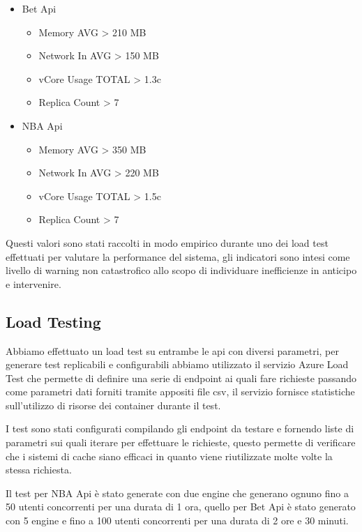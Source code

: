 \begin{itemize}
    \item Bet Api
    \begin{itemize}
        \item Memory AVG > 210 MB
        \item Network In AVG > 150 MB
        \item vCore Usage TOTAL > 1.3c
        \item Replica Count > 7
    \end{itemize}
    \item NBA Api
    \begin{itemize}
        \item Memory AVG > 350 MB
        \item Network In AVG > 220 MB
        \item vCore Usage TOTAL > 1.5c
        \item Replica Count > 7
    \end{itemize}
\end{itemize}

Questi valori sono stati raccolti in modo empirico durante uno dei load test effettuati per valutare la performance del sistema, gli indicatori sono intesi come livello di warning non catastrofico allo scopo di individuare inefficienze in anticipo e intervenire.

\subsection{Load Testing}
Abbiamo effettuato un load test su entrambe le api con diversi parametri, per generare test replicabili e configurabili abbiamo utilizzato il servizio Azure Load Test che permette di definire una serie di endpoint ai quali fare richieste passando come parametri dati forniti tramite appositi file csv, il servizio fornisce statistiche sull'utilizzo di risorse dei container durante il test.

I test sono stati configurati compilando gli endpoint da testare e fornendo liste di parametri sui quali iterare per effettuare le richieste, questo permette di verificare che i sistemi di cache siano efficaci in quanto viene riutilizzate molte volte la stessa richiesta.

Il test per NBA Api è stato generate con due engine che generano ognuno fino a 50 utenti concorrenti per una durata di 1 ora, quello per Bet Api è stato generato con 5 engine e fino a 100 utenti concorrenti per una durata di 2 ore e 30 minuti.

